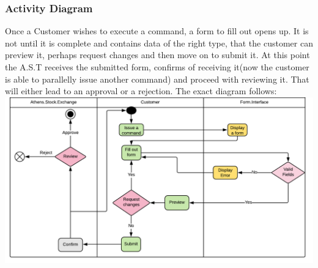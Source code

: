 \documentclass{article}
\begin{document}
\subsubsection{Activity Diagram}
Once a Customer wishes to execute a command, a form to fill out opens up. It is not until it is complete and contains data of the right type, that the customer can preview it, perhaps request changes and then move on to submit it. At this point the A.S.T receives the submitted form, confirms of receiving it(now the customer is able to parallelly issue another command) and proceed with reviewing it. That will either lead to an approval or a rejection. The exact diagram follows:\\
\includegraphics[scale=0.6]{activity}    
\end{document}
